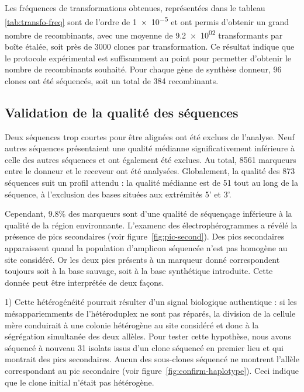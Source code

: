 Les fréquences de transformations obtenues, représentées dans le tableau
\ref{tab:transfo-freq} sont de l'ordre de \num{1e-5} et ont permis d'obtenir un
grand nombre de recombinants, avec une moyenne de \num{9.2e+02} transformants
par boîte étalée, soit près de \num{3000} clones par transformation. Ce résultat
indique que le protocole expérimental est suffisamment au point pour permetter
d'obtenir le nombre de recombinants souhaité. Pour chaque gène de synthèse
donneur, \num{96} clones ont été séquencés, soit un total de \num{384}
recombinants.

\subsection{Validation de la qualité des séquences}
\label{sub:result-qualite}

Deux séquences trop courtes pour être alignées ont été exclues de l'analyse.
Neuf autres séquences présentaient une qualité médianne significativement
inférieure à celle des autres séquences et ont également été exclues. Au total,
\num{8561} marqueurs entre le donneur et le receveur ont été
analysées. Globalement, la qualité des \num{873} séquences suit un profil
attendu : la qualité médianne est de \num{51} tout au long de la séquence, à
l'exclusion des bases situées aux extrémités 5' et 3'.

Cependant, \num{9.8}\% des marqueurs sont d'une qualité de séquençage inférieure
à la qualité de la région environnante. L'examenc des électrophérogrammes a
révélé la présence de pics secondaires (voir figure~\ref{fig:pic-second}). Des
pics secondaires apparaissent quand la population d'amplicon séquencée n'est pas
homogène au site considéré. Or les deux pics présents à un marqueur donné
correspondent toujours soit à la base sauvage, soit à la base synthétique
introduite. Cette donnée peut être interprétée de deux façons.

1) Cette hétérogénéité pourrait résulter d'un signal biologique authentique : si
les mésappariemments de l'hétéroduplex ne sont pas réparés, la division de la
cellule mère conduirait à une colonie hétérogène au site considéré et donc à la
ségrégation simultanée des deux allèles. Pour tester cette hypothèse, nous avons
séquencé à nouveau \num{31} isolats issus d'un clone séquencé en premier lieu et
qui montrait des pics secondaires. Aucun des sous-clones séquencé ne montrent
l'allèle correspondant au pic secondaire (voir
figure~\ref{fig:confirm-haplotype}). Ceci indique que le clone initial n'était
pas hétérogène.

